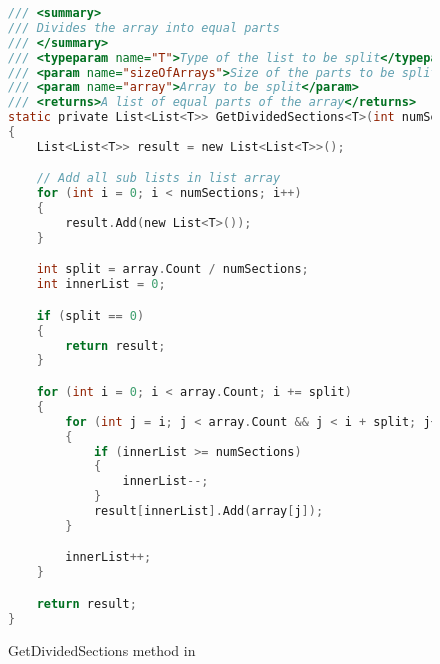 
\label{GetDividedSections Method}


\begin{figure}
\begin{lstlisting}[language=C]
/// <summary>
/// Divides the array into equal parts
/// </summary>
/// <typeparam name="T">Type of the list to be split</typeparam>
/// <param name="sizeOfArrays">Size of the parts to be split into</param>
/// <param name="array">Array to be split</param>
/// <returns>A list of equal parts of the array</returns>
static private List<List<T>> GetDividedSections<T>(int numSections, List<T> array)
{
	List<List<T>> result = new List<List<T>>();

	// Add all sub lists in list array
	for (int i = 0; i < numSections; i++)
	{
		result.Add(new List<T>());
	}

	int split = array.Count / numSections;
	int innerList = 0;

	if (split == 0)
	{
		return result;
	}

	for (int i = 0; i < array.Count; i += split)
	{
		for (int j = i; j < array.Count && j < i + split; j++)
		{
			if (innerList >= numSections)
			{
				innerList--;
			}
			result[innerList].Add(array[j]);
		}

		innerList++;
	}

	return result;
}
\end{lstlisting}
\caption{GetDividedSections method in \mytool}
\label{fig:GetDividedSections1}
\end{figure}
